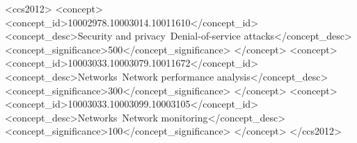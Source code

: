 \documentclass[sigconf]{acmart}
\begin{document}
\begin{CCSXML}
<ccs2012>
<concept>
<concept_id>10002978.10003014.10011610</concept_id>
<concept_desc>Security and privacy~Denial-of-service attacks</concept_desc>
<concept_significance>500</concept_significance>
</concept>
<concept>
<concept_id>10003033.10003079.10011672</concept_id>
<concept_desc>Networks~Network performance analysis</concept_desc>
<concept_significance>300</concept_significance>
</concept>
<concept>
<concept_id>10003033.10003099.10003105</concept_id>
<concept_desc>Networks~Network monitoring</concept_desc>
<concept_significance>100</concept_significance>
</concept>
</ccs2012>
\end{CCSXML}





\maketitle









%



\end{document}

